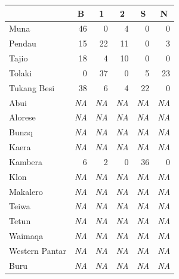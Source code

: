 \begin{table}
\begin{tabular}{lrrrrr}
  \lsptoprule
 & \multicolumn{1}{c}{B} & \multicolumn{1}{c}{1} & \multicolumn{1}{c}{2} & \multicolumn{1}{c}{S} & \multicolumn{1}{c}{N} \tabularnewline 
  \midrule
  Muna &  46 &   0 &   4 &   0 &   0 \tabularnewline 
  Pendau &  15 &  22 &  11 &   0 &   3 \tabularnewline 
  Tajio &  18 &   4 &  10 &   0 &   0 \tabularnewline 
  Tolaki &   0 &  37 &   0 &   5 &  23 \tabularnewline 
  Tukang Besi &  38 &   6 &   4 &  22 &   0 \tabularnewline \midrule
  {\color{gray}Abui} & {\color{gray}\textit{NA}} & {\color{gray}\textit{NA}} & {\color{gray}\textit{NA}} &   {\color{gray}\textit{NA}} & {\color{gray}\textit{NA}} \tabularnewline 
  {\color{gray}Alorese} & {\color{gray}\textit{NA}} & {\color{gray}\textit{NA}} & {\color{gray}\textit{NA}} &   {\color{gray}\textit{NA}} & {\color{gray}\textit{NA}} \tabularnewline 
  {\color{gray}Bunaq} & {\color{gray}\textit{NA}} & {\color{gray}\textit{NA}} & {\color{gray}\textit{NA}} &   {\color{gray}\textit{NA}} & {\color{gray}\textit{NA}} \tabularnewline 
  {\color{gray}Kaera} & {\color{gray}\textit{NA}} & {\color{gray}\textit{NA}} & {\color{gray}\textit{NA}} &   {\color{gray}\textit{NA}} & {\color{gray}\textit{NA}} \tabularnewline
  Kambera &  6 &   2 &   0 &  36 &   0 \tabularnewline
  {\color{gray}Klon} & {\color{gray}\textit{NA}} & {\color{gray}\textit{NA}} & {\color{gray}\textit{NA}} &   {\color{gray}\textit{NA}} & {\color{gray}\textit{NA}} \tabularnewline 
  {\color{gray}Makalero} & {\color{gray}\textit{NA}} & {\color{gray}\textit{NA}} & {\color{gray}\textit{NA}} &  {\color{gray}\textit{NA}} & {\color{gray}\textit{NA}} \tabularnewline 
  {\color{gray}Teiwa} & {\color{gray}\textit{NA}} & {\color{gray}\textit{NA}} & {\color{gray}\textit{NA}} &   {\color{gray}\textit{NA}} & {\color{gray}\textit{NA}} \tabularnewline 
  {\color{gray}Tetun} & {\color{gray}\textit{NA}} & {\color{gray}\textit{NA}} & {\color{gray}\textit{NA}} &   {\color{gray}\textit{NA}} & {\color{gray}\textit{NA}} \tabularnewline 
  {\color{gray}Waimaqa} & {\color{gray}\textit{NA}} & {\color{gray}\textit{NA}} & {\color{gray}\textit{NA}} &   {\color{gray}\textit{NA}} & {\color{gray}\textit{NA}} \tabularnewline 
  {\color{gray}Western Pantar} & {\color{gray}\textit{NA}} & {\color{gray}\textit{NA}} & {\color{gray}\textit{NA}} &  {\color{gray}\textit{NA}} & {\color{gray}\textit{NA}} \tabularnewline \midrule 
  {\color{gray}Buru} & {\color{gray}\textit{NA}} & {\color{gray}\textit{NA}} & {\color{gray}\textit{NA}} & {\color{gray}\textit{NA}} & {\color{gray}\textit{NA}} \tabularnewline

\end{tabular}
\end{table}
